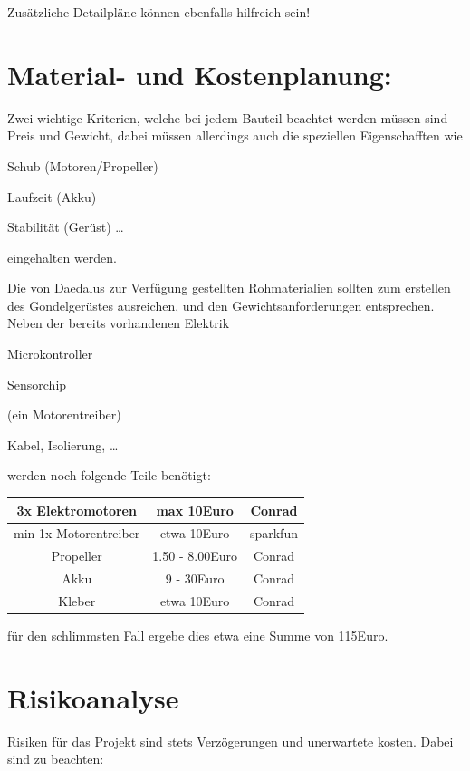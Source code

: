 \documentclass[lang=ngerman,inputenc=utf8,fontsize=10pt]{ldvarticle}
\begin{document}
\begin{itemize}
Zusätzliche Detailpläne können ebenfalls hilfreich sein!

\section{Material- und Kostenplanung:}


Zwei wichtige Kriterien, welche bei jedem Bauteil beachtet werden müssen sind Preis und Gewicht, dabei müssen allerdings auch die speziellen Eigenschafften wie
\begin{list}{-}{}
\item Schub (Motoren/Propeller)
\item Laufzeit (Akku)
\item Stabilität (Gerüst)
…
\end{list}
eingehalten werden.

Die von Daedalus zur Verfügung gestellten Rohmaterialien sollten zum erstellen des Gondelgerüstes ausreichen, und den Gewichtsanforderungen entsprechen. Neben der bereits vorhandenen Elektrik
\begin{list}{-}{}
\item Microkontroller
\item Sensorchip
\item (ein Motorentreiber)
\item Kabel, Isolierung, …
\end{list}
werden noch folgende Teile benötigt:

\begin{tabular}{|c|c|c|}
\hline 
3x Elektromotoren & max 10Euro & Conrad \\ 
\hline 
min 1x Motorentreiber & etwa 10Euro & sparkfun \\ 
\hline 
Propeller & 1.50 - 8.00Euro & Conrad \\ 
\hline 
Akku & 9 - 30Euro & Conrad \\ 
\hline 
Kleber & etwa 10Euro & Conrad \\ 
\hline 
\end{tabular} 

für den schlimmsten Fall ergebe dies etwa eine Summe von 115Euro.




\section{Risikoanalyse}

Risiken für das Projekt sind stets Verzögerungen und unerwartete kosten. Dabei sind zu beachten: 


\end{itemize}
\end{document}
